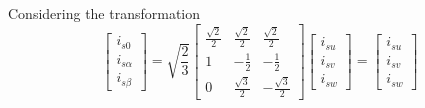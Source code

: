 \documentclass[11pt,a4paper,oneside]{book}
\numberwithin{equation}{section}
\theoremstyle{it}
\theoremstyle{definition}
\begin{document}
Considering the transformation 
\begin{equation} \label{eq32}
	\left[
	\begin{matrix}
		i_{s0}		\\[6pt]
		i_{s\alpha} \\[6pt]
		i_{s\beta}
	\end{matrix} \right] = \sqrt{\frac{2}{3}}
	\left[
	\begin{matrix}
		\frac{\sqrt{2}}{2} & \frac{\sqrt{2}}{2} & \frac{\sqrt{2}}{2} \\[6pt]
		1 & -\frac{1}{2} & -\frac{1}{2} \\[6pt]
		0 & \frac{\sqrt{3}}{2} & -\frac{\sqrt{3}}{2}
	\end{matrix} \right]
	\left[
	\begin{matrix}
		i_{su} \\[6pt]
		i_{sv} \\[6pt]
		i_{sw}
	\end{matrix} \right] = 
	\left[
	\begin{matrix}
		i_{su} \\[6pt]
		i_{sv} \\[6pt]
		i_{sw}
	\end{matrix} \right]
\end{equation}
\end{document}

